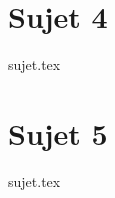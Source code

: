 \documentclass[a4paper, 11pt]{book}
\begin{document}

\chapter{Sujet 4}
\resetQ
{sujet.tex}

\chapter{Sujet 5}
\resetQ
{sujet.tex}
\end{document}
